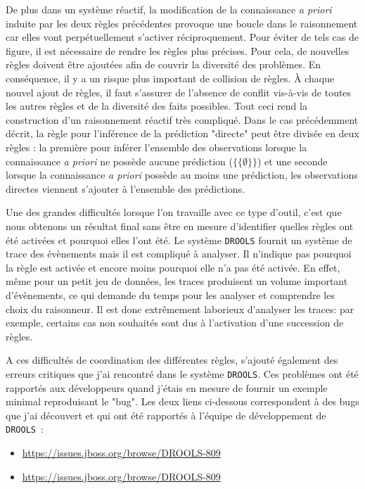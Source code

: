 \begin{refsegment}
De plus dans un système réactif, la modification de la connaissance \textit{a priori} induite par les deux règles précédentes provoque une boucle dans le raisonnement car elles vont perpétuellement s'activer réciproquement. Pour éviter de tels cas de figure, il est nécessaire de rendre les règles plus précises. Pour cela, de nouvelles règles doivent être ajoutées afin de couvrir la diversité des problèmes. En conséquence, il y a un risque plus important de collision de règles. À chaque nouvel ajout de règles, il faut s'assurer de l'absence de conflit vis-à-vis de toutes les autres règles et de la diversité des faits possibles. Tout ceci rend la construction d'un raisonnement réactif très compliqué. Dans le cas précédemment décrit, la règle  pour l'inférence de la  prédiction "directe"  peut être divisée en deux règles : la première pour inférer l'ensemble des observations lorsque la connaissance \textit{a priori} ne possède aucune prédiction ($\{\{\emptyset\}\}$) et une seconde lorsque la connaissance \textit{a priori} possède au moins une prédiction, les observations directes viennent s'ajouter à l'ensemble des prédictions.

Une des grandes difficultés lorsque l'on travaille avec ce type d'outil, c'est que nous obtenons un résultat final sans être en mesure d'identifier quelles règles ont été activées et pourquoi elles l'ont été. Le système \texttt{DROOLS} fournit un système de trace des évènements mais il est compliqué à analyser. Il n'indique pas pourquoi la règle est activée et encore moins pourquoi elle n'a pas été activée. En effet, même pour un petit jeu de données, les traces produisent un volume important d'évènements, ce qui demande du temps pour les analyser et comprendre les choix du raisonneur. Il est donc extrêmement laborieux d'analyser les traces: par exemple, certains cas non souhaités sont dus à l'activation d'une succession de règles.

A ces difficultés de coordination des différentes règles, s'ajouté également des erreurs critiques que j'ai rencontré dans le système \texttt{DROOLS}. Ces problèmes ont été rapportés aux développeurs quand j'étais en mesure de fournir un exemple minimal reproduisant le "bug". Les deux liens ci-dessous correspondent à des bugs que j'ai découvert et qui ont été rapportés à l’équipe de développement de \texttt{DROOLS} :
\begin{itemize}
	\item \url{https://issues.jboss.org/browse/DROOLS-809}
	\item \url{https://issues.jboss.org/browse/DROOLS-809}
\end{itemize}
 

\end{refsegment}
